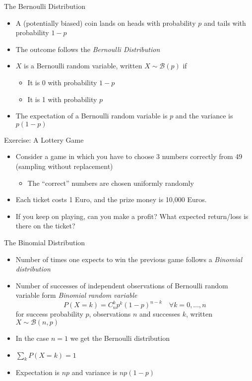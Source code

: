 \documentclass{beamer}
\begin{document}
\begin{frame}{The Bernoulli Distribution}
\begin{itemize}
 \item A (potentially biased) coin lands on heads with probability $p$ and tails with probability $1-p$
\item The outcome follows the \emph{Bernoulli Distribution} 
\item $X$ is a Bernoulli random variable, written $X \sim \mathcal{B}(p)$ if 
\begin{itemize}
\item It is 0 with probability $1-p$ 
\item It is 1 with probability $p$ 
\end{itemize} 
\item The expectation of a Bernoulli random variable is $p$ and the variance is $p(1-p)$
\end{itemize}
\end{frame}


\begin{frame}{Exercise: A Lottery Game}  
\begin{itemize} 
\item Consider a game in which you have to choose 3 numbers correctly from 49 (sampling without replacement) 
\begin{itemize}
\item The ``correct'' numbers are chosen uniformly randomly 
\end{itemize}
\item Each ticket costs 1 Euro, and the prize money is 10,000 Euros. 
\item If you keep on playing, can you make a profit? What expected return/loss is there on the ticket?
\end{itemize}
\end{frame}

\begin{frame}{The Binomial Distribution} 
\begin{itemize} 
 \item Number of times one expects to win the previous game follows a \emph{Binomial distribution}  
\item Number of successes of independent observations of Bernoulli random variable form \emph{Binomial random variable} 
\begin{displaymath} 
 P(X = k) = C^k_n p^k (1-p)^{n-k} \quad \forall k = 0, \ldots, n
\end{displaymath}
for success probability $p$, observations $n$ and successes $k$, written $X \sim \mathcal{B}(n, p)$ 
\item In the case $n=1$ we get the Bernoulli distribution 
\item $\sum_k P(X = k) = 1$  
\item Expectation is $np$ and variance is $np(1-p)$
\end{itemize}
\end{frame}
\end{document}
